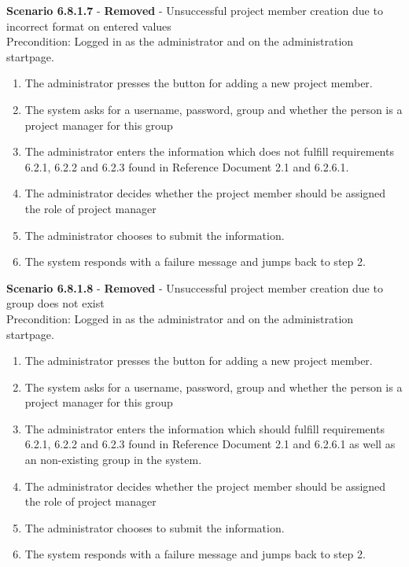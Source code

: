\documentclass{article}
\begin{document}
\noindent\textbf{Scenario 6.8.1.7} - \textbf{Removed} - Unsuccessful project member creation due to incorrect format on entered values \\
Precondition: Logged in as the administrator and on the administration startpage.
\begin{enumerate}
\item The administrator presses the button for adding a new project member.
\item The system asks for a username, password, group and whether the person is a project manager for this group
\item The administrator enters the information which does not fulfill requirements 6.2.1, 6.2.2 and 6.2.3 found in Reference Document 2.1 and 6.2.6.1.
\item The administrator decides whether the project member should be assigned the role of project manager
\item The administrator chooses to submit the information.
\item The system responds with a failure message and jumps back to step 2.
\end{enumerate}

\noindent\textbf{Scenario 6.8.1.8} - \textbf{Removed} - Unsuccessful project member creation due to group does not exist  \\
Precondition: Logged in as the administrator and on the administration startpage.
\begin{enumerate}
\item The administrator presses the button for adding a new project member.
\item The system asks for a username, password, group and whether the person is a project manager for this group
\item The administrator enters the information which should fulfill requirements 6.2.1, 6.2.2 and 6.2.3 found in Reference Document 2.1 and 6.2.6.1 as well as an non-existing group in the system.
\item The administrator decides whether the project member should be assigned the role of project manager
\item The administrator chooses to submit the information.
\item The system responds with a failure message and jumps back to step 2.
\end{enumerate}
\end{document}
